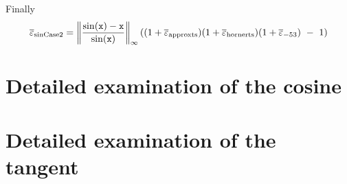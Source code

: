 Finally
\begin{equation}
  \maxeps_{\mathrm{sinCase2}} =  \left\Vert\frac{\sin(\mathtt{x})-\mathtt{x}}{\sin(\mathtt{x})}\right\Vert_{\infty}((1+\maxeps_{\mathrm{approxts}})(1+\maxeps_{\mathrm{hornerts}})(1+\maxeps_{-53})\ -\ 1)
  \label{eq:SinCase2Total2}
\end{equation}
 



\section{Detailed examination of the cosine}
\section{Detailed examination of the tangent}
